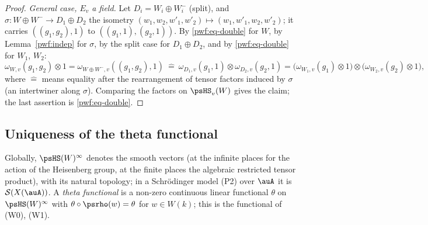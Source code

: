 \documentclass[10pt]{amsart}
\theoremstyle{definition}
\theoremstyle{remark}
\providecommand{\auS}{\mathcal S}
\begin{document}
\begin{proof}
\emph{General case, $E_v$ a field.} Let $D_i=W_i\oplus W_i^-$ (split), and $\sigma\colon
W\oplus W^-\to D_1\oplus D_2$ the isometry $(w_1,w_2,w'_1,w'_2)\mapsto(w_1,w'_1,w_2,w'_2)$; it
carries $((g_1,g_2),1)$ to $((g_1,1),(g_2,1))$. By \eqref{pwf:eq-double} for $W$, by
Lemma~\ref{pwf:indep} for $\sigma$, by the split case for $D_1\oplus D_2$, and by
\eqref{pwf:eq-double} for $W_1$, $W_2$:
\[
\omega_{W,v}(g_1,g_2)\otimes1=\omega_{W\oplus W^-,v}((g_1,g_2),1)\ \hat=\ \omega_{D_1,v}(g_1,1)\otimes
\omega_{D_2,v}(g_2,1)=\bigl(\omega_{W_1,v}(g_1)\otimes1\bigr)\otimes\bigl(\omega_{W_2,v}(g_2)\otimes1
\bigr),
\]
where $\hat=$ means equality after the rearrangement of tensor factors induced by $\sigma$ (an
intertwiner along $\sigma$). Comparing the factors on $\psHS_v(W)$ gives the claim; the last
assertion is \eqref{pwf:eq-double}.
\end{proof}

\subsection{Uniqueness of the theta functional}\label{pwf:ss-unique}

Globally, $\psHS(W)^\infty$ denotes the smooth vectors (at the infinite places for the action of
the Heisenberg group, at the finite places the algebraic restricted tensor product), with its
natural topology; in a Schr\"odinger model (P2) over $\auA$ it is $\auS(X(\auA))$. A \emph{theta
functional} is a non-zero continuous linear functional $\theta$ on $\psHS(W)^\infty$ with
$\theta\circ\psrho(w)=\theta$ for $w\in W(k)$; this is the functional of (W0), (W1).
\end{document}
